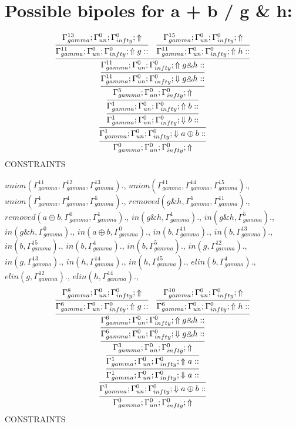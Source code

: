 \documentclass[a4paper, 11pt]{article}
\begin{document}
\section{Possible bipoles for a + b / g \& h:} 

\[
\infer{\Gamma_{ gamma}^{0} ; \Gamma_{un}^{0} ; \Gamma_{ infty}^{0} ;  \Uparrow }
{\infer{\Gamma_{ gamma}^{1} ; \Gamma_{un}^{0} ; \Gamma_{ infty}^{0} ;  \Downarrow a \oplus b :: }
{\infer{\Gamma_{ gamma}^{1} ; \Gamma_{un}^{0} ; \Gamma_{ infty}^{0} ;  \Downarrow b :: }
{\infer{\Gamma_{ gamma}^{1} ; \Gamma_{un}^{0} ; \Gamma_{ infty}^{0} ;  \Uparrow b :: }
{\infer{\Gamma_{ gamma}^{5} ; \Gamma_{un}^{0} ; \Gamma_{ infty}^{0} ;  \Uparrow }
{\infer{\Gamma_{ gamma}^{11} ; \Gamma_{un}^{0} ; \Gamma_{ infty}^{0} ;  \Downarrow g \binampersand h :: }
{\infer{\Gamma_{ gamma}^{11} ; \Gamma_{un}^{0} ; \Gamma_{ infty}^{0} ;  \Uparrow g \binampersand h :: }
{\infer{\Gamma_{ gamma}^{11} ; \Gamma_{un}^{0} ; \Gamma_{ infty}^{0} ;  \Uparrow g :: }
{\Gamma_{ gamma}^{13} ; \Gamma_{un}^{0} ; \Gamma_{ infty}^{0} ;  \Uparrow }
&
\infer{\Gamma_{ gamma}^{11} ; \Gamma_{un}^{0} ; \Gamma_{ infty}^{0} ;  \Uparrow h :: }
{\Gamma_{ gamma}^{15} ; \Gamma_{un}^{0} ; \Gamma_{ infty}^{0} ;  \Uparrow }}}}}}}}
\]
CONSTRAINTS

$union(\Gamma_{gamma}^{11}, \Gamma_{gamma}^{12}, \Gamma_{gamma}^{13}).$, $union(\Gamma_{gamma}^{11}, \Gamma_{gamma}^{14}, \Gamma_{gamma}^{15}).$, $union(\Gamma_{gamma}^{1}, \Gamma_{gamma}^{4}, \Gamma_{gamma}^{5}).$, $removed(g \binampersand h, \Gamma_{gamma}^{5}, \Gamma_{gamma}^{11}).$, $removed(a \oplus b, \Gamma_{gamma}^{0}, \Gamma_{gamma}^{1}).$, $in(g \binampersand h, \Gamma_{gamma}^{1}).$, $in(g \binampersand h, \Gamma_{gamma}^{5}).$, $in(g \binampersand h, \Gamma_{gamma}^{0}).$, $in(a \oplus b, \Gamma_{gamma}^{0}).$, $in(b, \Gamma_{gamma}^{11}).$, $in(b, \Gamma_{gamma}^{13}).$, $in(b, \Gamma_{gamma}^{15}).$, $in(b, \Gamma_{gamma}^{4}).$, $in(b, \Gamma_{gamma}^{5}).$, $in(g, \Gamma_{gamma}^{12}).$, $in(g, \Gamma_{gamma}^{13}).$, $in(h, \Gamma_{gamma}^{14}).$, $in(h, \Gamma_{gamma}^{15}).$, $elin(b, \Gamma_{gamma}^{4}).$, $elin(g, \Gamma_{gamma}^{12}).$, $elin(h, \Gamma_{gamma}^{14}).$, 
\[
\infer{\Gamma_{ gamma}^{0} ; \Gamma_{un}^{0} ; \Gamma_{ infty}^{0} ;  \Uparrow }
{\infer{\Gamma_{ gamma}^{1} ; \Gamma_{un}^{0} ; \Gamma_{ infty}^{0} ;  \Downarrow a \oplus b :: }
{\infer{\Gamma_{ gamma}^{1} ; \Gamma_{un}^{0} ; \Gamma_{ infty}^{0} ;  \Downarrow a :: }
{\infer{\Gamma_{ gamma}^{1} ; \Gamma_{un}^{0} ; \Gamma_{ infty}^{0} ;  \Uparrow a :: }
{\infer{\Gamma_{ gamma}^{3} ; \Gamma_{un}^{0} ; \Gamma_{ infty}^{0} ;  \Uparrow }
{\infer{\Gamma_{ gamma}^{6} ; \Gamma_{un}^{0} ; \Gamma_{ infty}^{0} ;  \Downarrow g \binampersand h :: }
{\infer{\Gamma_{ gamma}^{6} ; \Gamma_{un}^{0} ; \Gamma_{ infty}^{0} ;  \Uparrow g \binampersand h :: }
{\infer{\Gamma_{ gamma}^{6} ; \Gamma_{un}^{0} ; \Gamma_{ infty}^{0} ;  \Uparrow g :: }
{\Gamma_{ gamma}^{8} ; \Gamma_{un}^{0} ; \Gamma_{ infty}^{0} ;  \Uparrow }
&
\infer{\Gamma_{ gamma}^{6} ; \Gamma_{un}^{0} ; \Gamma_{ infty}^{0} ;  \Uparrow h :: }
{\Gamma_{ gamma}^{10} ; \Gamma_{un}^{0} ; \Gamma_{ infty}^{0} ;  \Uparrow }}}}}}}}
\]
CONSTRAINTS
\end{document}
